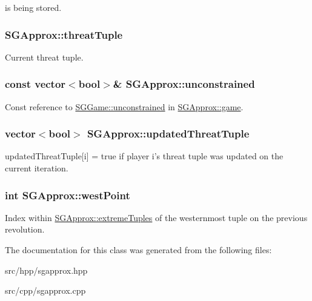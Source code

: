  is being stored. \hypertarget{classSGApprox_a69815072fd57ec5b6b137dc839371ec7}{
\subsubsection[{threat\-Tuple}]{ S\-G\-Approx\-::threat\-Tuple\hspace{0.3cm}{\ttfamily [private]}}}\label{classSGApprox_a69815072fd57ec5b6b137dc839371ec7}
Current threat tuple. \hypertarget{classSGApprox_a302549fb3037b3db0e6313db35229c97}{
\subsubsection[{unconstrained}]{\setlength{\rightskip}{0pt plus 5cm}const vector$<$bool$>$\& S\-G\-Approx\-::unconstrained\hspace{0.3cm}{\ttfamily [private]}}}\label{classSGApprox_a302549fb3037b3db0e6313db35229c97}
Const reference to \hyperlink{classSGGame_a528852e11bd68322535d7f24a41eca20}{S\-G\-Game\-::unconstrained} in \hyperlink{classSGApprox_a0774e3ed0ff009809606a42c9e7ef727}{S\-G\-Approx\-::game}. \hypertarget{classSGApprox_ae680fd19d6a65aecee81dffeba8e8595}{
\subsubsection[{updated\-Threat\-Tuple}]{\setlength{\rightskip}{0pt plus 5cm}vector$<$bool$>$ S\-G\-Approx\-::updated\-Threat\-Tuple\hspace{0.3cm}{\ttfamily [private]}}}\label{classSGApprox_ae680fd19d6a65aecee81dffeba8e8595}
updated\-Threat\-Tuple\mbox{[}i\mbox{]} = true if player i's threat tuple was updated on the current iteration. \hypertarget{classSGApprox_aa0c6296f28ce5527edc9829e4d9c23a1}{
\subsubsection[{west\-Point}]{\setlength{\rightskip}{0pt plus 5cm}int S\-G\-Approx\-::west\-Point\hspace{0.3cm}{\ttfamily [private]}}}\label{classSGApprox_aa0c6296f28ce5527edc9829e4d9c23a1}
Index within \hyperlink{classSGApprox_ab0e2c4678401f806922ac64667ad5ff6}{S\-G\-Approx\-::extreme\-Tuples} of the westernmost tuple on the previous revolution. 

The documentation for this class was generated from the following files\-:\begin{DoxyCompactItemize}
\item 
src/hpp/sgapprox.\-hpp\item 
src/cpp/sgapprox.\-cpp\end{DoxyCompactItemize}
